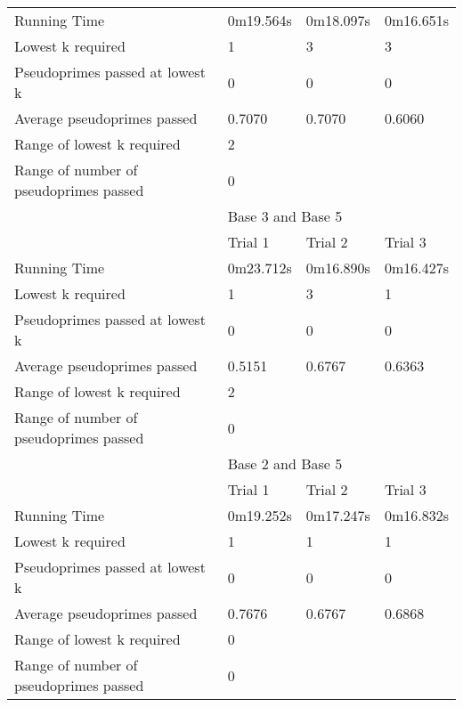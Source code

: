 \documentclass{article}
\begin{document}
\begin{appendices}
\begin{longtable}{llll}
Running Time                           & 0m19.564s   & 0m18.097s  & 0m16.651s  \\
Lowest k required                      & 1           & 3          & 3          \\
Pseudoprimes passed at lowest k        & 0           & 0          & 0          \\
Average pseudoprimes passed            & 0.7070      & 0.7070     & 0.6060     \\\cmidrule(lr){2-4}
Range of lowest k required             & \multicolumn{3}{l}{2}                 \\
Range of number of pseudoprimes passed & \multicolumn{3}{l}{0}                 \\\midrule
                                       & \multicolumn{3}{l}{Base 3 and Base 5} \\\midrule
                                       & Trial 1     & Trial 2    & Trial 3    \\
Running Time                           & 0m23.712s   & 0m16.890s  & 0m16.427s  \\
Lowest k required                      & 1           & 3          & 1          \\
Pseudoprimes passed at lowest k        & 0           & 0          & 0          \\
Average pseudoprimes passed            & 0.5151      & 0.6767     & 0.6363     \\\cmidrule(lr){2-4}
Range of lowest k required             & \multicolumn{3}{l}{2}                 \\
Range of number of pseudoprimes passed & \multicolumn{3}{l}{0}                 \\\midrule
                                       & \multicolumn{3}{l}{Base 2 and Base 5} \\\midrule
                                       & Trial 1     & Trial 2    & Trial 3    \\
Running Time                           & 0m19.252s   & 0m17.247s  & 0m16.832s  \\
Lowest k required                      & 1           & 1          & 1          \\
Pseudoprimes passed at lowest k        & 0           & 0          & 0          \\
Average pseudoprimes passed            & 0.7676      & 0.6767     & 0.6868     \\\cmidrule(lr){2-4}
Range of lowest k required             & \multicolumn{3}{l}{0}                 \\
Range of number of pseudoprimes passed & \multicolumn{3}{l}{0}                 \\ \bottomrule
\end{longtable}
\FloatBarrier


\end{appendices}
\end{document}
